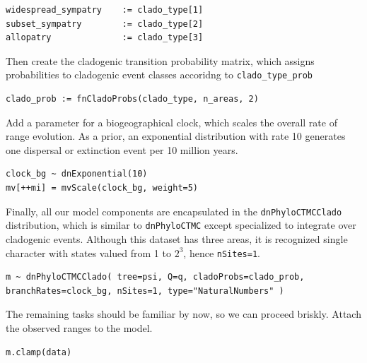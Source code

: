 \begin{snugshade}
\begin{lstlisting}
widespread_sympatry    := clado_type[1]
subset_sympatry        := clado_type[2]
allopatry              := clado_type[3]
\end{lstlisting}
\end{snugshade}

Then create the cladogenic transition probability matrix, which assigns probabilities to cladogenic event classes accoridng to {\tt clado\_type\_prob}

\begin{snugshade}
\begin{lstlisting}
clado_prob := fnCladoProbs(clado_type, n_areas, 2)
\end{lstlisting}
\end{snugshade}

Add a parameter for a biogeographical clock, which scales the overall rate of range evolution.
As a prior, an exponential distribution with rate 10 generates one dispersal or extinction event per 10 million years.

\begin{snugshade}
\begin{lstlisting}
clock_bg ~ dnExponential(10)
mv[++mi] = mvScale(clock_bg, weight=5)
\end{lstlisting}
\end{snugshade}

Finally, all our model components are encapsulated in the {\tt dnPhyloCTMCClado} distribution, which is similar to {\tt dnPhyloCTMC} except specialized to integrate over cladogenic events. Although this dataset has three areas, it is recognized single character with states valued from 1 to $2^3$, hence {\tt nSites=1}.

\begin{snugshade}
\begin{lstlisting}
m ~ dnPhyloCTMCClado( tree=psi, Q=q, cladoProbs=clado_prob, branchRates=clock_bg, nSites=1, type="NaturalNumbers" )
\end{lstlisting}
\end{snugshade}

The remaining tasks should be familiar by now, so we can proceed briskly. Attach the observed ranges to the model.

\begin{snugshade}
\begin{lstlisting}
m.clamp(data)
\end{lstlisting}
\end{snugshade}


